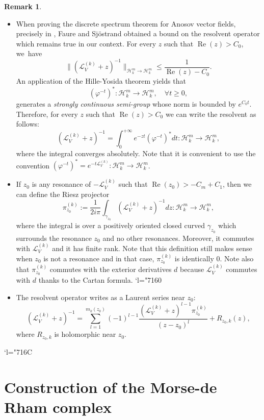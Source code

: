 \documentclass[11pt]{article}
\newcommand{\skpt}{\smallskip}
\newcommand{\Changel}{\mathcode`l="7160}
\newcommand{\Changelback}{\mathcode`l="716C}
\theoremstyle{definition}
\newtheorem{remark}[definition]{Remark}
\theoremstyle{plain}
\newcommand{\Hil}{\mathcal{H}}
\newcommand{\Lie}{\mathcal{L}}
\DeclareMathOperator{\re}{Re}
\begin{document}
\skpt
\begin{remark}
\begin{itemize}
\item When proving the discrete spectrum theorem for Anosov vector fields, precisely in \cite[Lem.\,3.3, p.\,343]{FS}, Faure and Sjöstrand obtained a bound on the resolvent operator which remains true in our context. For every $z$ such that \hbox{$\re (z) \!>\! C_0$}, we~have
\[
\| (\Lie_V^{(k)} + z)^{-1} \|_{\Hil_k^m \to \Hil_k^m} \leq \frac{1}{\re (z) - C_0}.
\]
An application of the Hille-Yosida theorem \cite[Cor.\,3.6, p.\,76]{engel-nagel} yields that
\[
(\varphi^{-t})^*: \Hil_k^m \to \Hil_k^m, \quad \forall t \geq 0,
\]
generates a \emph{strongly continuous semi-group} whose norm is bounded by $e^{C_0 t}$. Therefore, for every $z$ such that $\re (z) > C_0$ we can write the resolvent as follows:
\[
(\Lie_V^{(k)} + z)^{-1} = \int_0^{+\infty} e^{-zt } (\varphi^{-t})^* dt: \Hil_k^m \to \Hil_k^m,
\]
where the integral converges absolutely. Note that it is convenient to use the convention $(\varphi^{-t})^* = e^{-t \Lie_V^{(k)}}: \Hil_k^m \to \Hil_k^m$.
\item If $z_0 $ is any resonance of $-\Lie_V^{(k)}$ such that $\re (z_0) > -C_m + C_1$, then we can define the Riesz projector
\[
\pi_{z_0}^{(k)}:= \frac{1}{2 i \pi} \int_{\gamma_{z_0}} (\Lie_V^{(k)} + z)^{-1} dz: \Hil_k^m \to \Hil_k^m,
\]
where the integral is over a positively oriented closed curved $\gamma_{z_0}$ which surrounds the resonance $z_0$ and no other resonances. Moreover, it commutes with $\Lie_V^{(k)}$ and it has finite rank. Note that this definition still makes sense when $z_0$ is not a resonance and in that case, $\pi_{z_0}^{(k)}$ is identically $0$. Note also that $\pi_{z_0}^{(k)}$ commutes with the exterior derivatives $d$ because $\Lie_V^{(k)}$ commutes with $d$ thanks to the Cartan formula.
\Changel
\item The resolvent operator writes as a Laurent series near $z_0$:
\[
(\Lie_V^{(k)} + z)^{-1} = \sum_{l = 1}^{m_k (z_0)} (-1)^{l-1} \frac{(\Lie_V^{(k)} + z)^{l-1} \pi_{z_0}^{(k)}}{(z - z_0)^{l}} + R_{z_0,k} (z),
\]
where $R_{z_0,k}$ is holomorphic near $z_0$.
\end{itemize}
\Changelback
\end{remark}

\section{Construction of the Morse-de Rham complex} \label{section topology}
\end{document}
